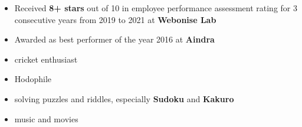 \documentclass[10pt,a4paper,ragged2e,withhyper]{altacv}
\begin{document}
\begin{paracol}{2}

{}

\vspace{2in}



\divider




\begin{itemize}
    \item Received \textbf{8+ stars} out of 10 in employee performance assessment rating for 3 consecutive years from 2019 to 2021 at \textbf{Webonise Lab}
    \item Awarded as best performer of the year 2016 at \textbf{Aindra}
\end{itemize}

\begin{itemize}
    \item cricket enthusiast
    \item Hodophile
    \item solving puzzles and riddles, especially \textbf{Sudoku} and \textbf{Kakuro}
    \item music and movies
\end{itemize}


\newpage





\end{paracol}
\end{document}
